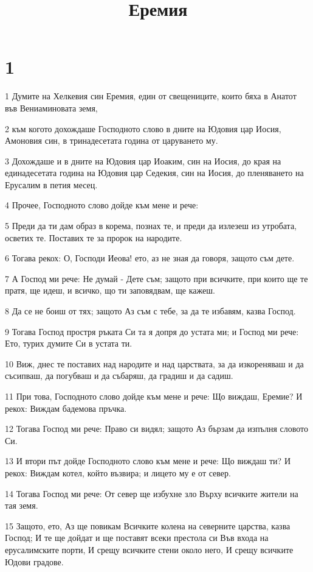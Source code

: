 

\title{Еремия}


\chapter{1}

\par 1 Думите на Хелкевия син Еремия, един от свещениците, които бяха в Анатот във Вениаминовата земя,
\par 2 към когото дохождаше Господното слово в дните на Юдовия цар Иосия, Амоновия син, в тринадесетата година от царуването му.
\par 3 Дохождаше и в дните на Юдовия цар Иоаким, син на Иосия, до края на единадесетата година на Юдовия цар Седекия, син на Иосия, до пленяването на Ерусалим в петия месец.
\par 4 Прочее, Господното слово дойде към мене и рече:
\par 5 Преди да ти дам образ в корема, познах те, и преди да излезеш из утробата, осветих те. Поставих те за пророк на народите.
\par 6 Тогава рекох: О, Господи Иеова! ето, аз не зная да говоря, защото съм дете.
\par 7 А Господ ми рече: Не думай - Дете съм; защото при всичките, при които ще те пратя, ще идеш, и всичко, що ти заповядвам, ще кажеш.
\par 8 Да се не боиш от тях; защото Аз съм с тебе, за да те избавям, казва Господ.
\par 9 Тогава Господ простря ръката Си та я допря до устата ми; и Господ ми рече: Ето, турих думите Си в устата ти.
\par 10 Виж, днес те поставих над народите и над царствата, за да изкореняваш и да съсипваш, да погубваш и да събаряш, да градиш и да садиш.
\par 11 При това, Господното слово дойде към мене и рече: Що виждаш, Еремие? И рекох: Виждам бадемова пръчка.
\par 12 Тогава Господ ми рече: Право си видял; защото Аз бързам да изпълня словото Си.
\par 13 И втори път дойде Господното слово към мене и рече: Що виждаш ти? И рекох: Виждам котел, който възвира; и лицето му е от север.
\par 14 Тогава Господ ми рече: От север ще избухне зло Върху всичките жители на тая земя.
\par 15 Защото, ето, Аз ще повикам Всичките колена на северните царства, казва Господ; И те ще дойдат и ще поставят всеки престола си Във входа на ерусалимските порти, И срещу всичките стени около него, И срещу всичките Юдови градове.
